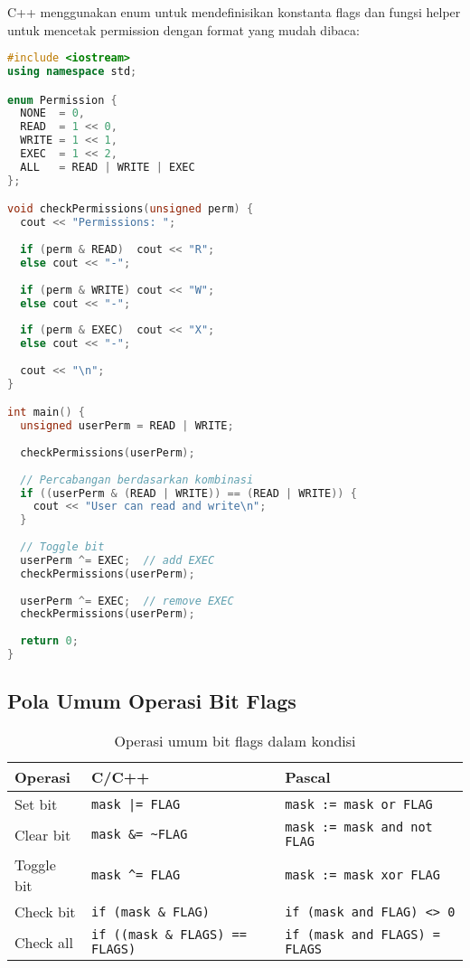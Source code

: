 \documentclass[../main.tex]{subfiles}
\begin{document}
C++ menggunakan enum untuk mendefinisikan konstanta flags dan fungsi helper untuk mencetak permission dengan format yang mudah dibaca:

\begin{lstlisting}[language=C++, caption={Bitwise flags dengan switch di C++}]
#include <iostream>
using namespace std;

enum Permission {
  NONE  = 0,
  READ  = 1 << 0,
  WRITE = 1 << 1,
  EXEC  = 1 << 2,
  ALL   = READ | WRITE | EXEC
};

void checkPermissions(unsigned perm) {
  cout << "Permissions: ";
  
  if (perm & READ)  cout << "R";
  else cout << "-";
  
  if (perm & WRITE) cout << "W";
  else cout << "-";
  
  if (perm & EXEC)  cout << "X";
  else cout << "-";
  
  cout << "\n";
}

int main() {
  unsigned userPerm = READ | WRITE;
  
  checkPermissions(userPerm);
  
  // Percabangan berdasarkan kombinasi
  if ((userPerm & (READ | WRITE)) == (READ | WRITE)) {
    cout << "User can read and write\n";
  }
  
  // Toggle bit
  userPerm ^= EXEC;  // add EXEC
  checkPermissions(userPerm);
  
  userPerm ^= EXEC;  // remove EXEC
  checkPermissions(userPerm);
  
  return 0;
}
\end{lstlisting}

\subsection{Pola Umum Operasi Bit Flags}
\begin{table}[H]
  \centering
  \caption{Operasi umum bit flags dalam kondisi}
  \begin{tabular}{@{}lll@{}}
    \toprule
    Operasi & C/C++ & Pascal \\
    \midrule
    Set bit & \texttt{mask |= FLAG} & \texttt{mask := mask or FLAG} \\
    Clear bit & \texttt{mask \&= \~{}FLAG} & \texttt{mask := mask and not FLAG} \\
    Toggle bit & \texttt{mask \^{}= FLAG} & \texttt{mask := mask xor FLAG} \\
    Check bit & \texttt{if (mask \& FLAG)} & \texttt{if (mask and FLAG) {\textless}{\textgreater} 0} \\
    Check all & \texttt{if ((mask \& FLAGS) == FLAGS)} & \texttt{if (mask and FLAGS) = FLAGS} \\
    \bottomrule
  \end{tabular}
\end{table}
\end{document}
